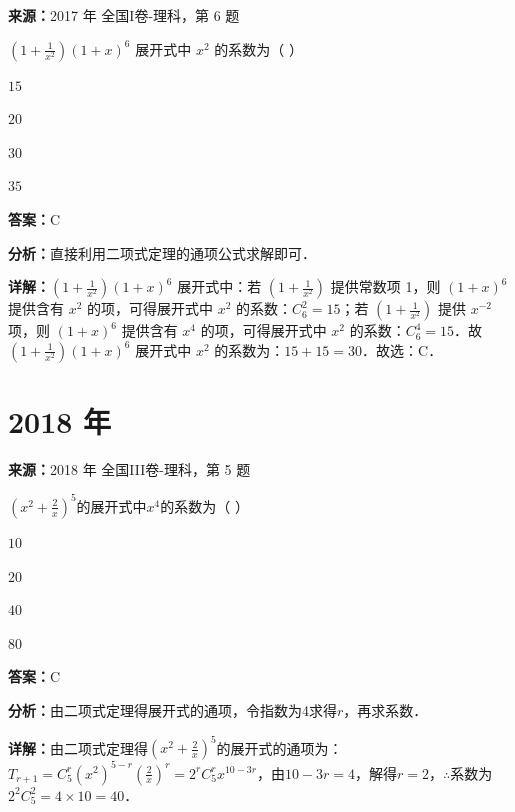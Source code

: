 \begin{question}[points=5]
\textbf{来源：}2017 年 全国I卷-理科，第 6 题\par
$(1+\frac{1}{x^2})(1+x)^6$ 展开式中 $x^2$ 的系数为（ ）
\begin{choices}
  \item $15$
  \item $20$
  \item $30$
  \item $35$
\end{choices}
\begin{solution}
\textbf{答案：}C

\textbf{分析：}直接利用二项式定理的通项公式求解即可．

\textbf{详解：}$(1+\frac{1}{x^2})(1+x)^6$ 展开式中：若 $(1+\frac{1}{x^2})$ 提供常数项 1，则 $(1+x)^6$ 提供含有 $x^2$ 的项，可得展开式中 $x^2$ 的系数：$C_6^2=15$；若 $(1+\frac{1}{x^2})$ 提供 $x^{-2}$ 项，则 $(1+x)^6$ 提供含有 $x^4$ 的项，可得展开式中 $x^2$ 的系数：$C_6^4=15$．故 $(1+\frac{1}{x^2})(1+x)^6$ 展开式中 $x^2$ 的系数为：$15+15=30$．故选：C．
\end{solution}
\end{question}

\section*{2018 年}

\begin{question}[points=5]
\textbf{来源：}2018 年 全国III卷-理科，第 5 题\par
$(x^2+\frac{2}{x})^5$的展开式中$x^4$的系数为（ ）
\begin{choices}
  \item $10$
  \item $20$
  \item $40$
  \item $80$
\end{choices}
\begin{solution}
\textbf{答案：}C

\textbf{分析：}由二项式定理得展开式的通项，令指数为4求得$r$，再求系数．

\textbf{详解：}由二项式定理得$(x^2+\frac{2}{x})^5$的展开式的通项为：$T_{r+1}=C_5^r (x^2)^{5-r}(\frac{2}{x})^r=2^r C_5^r x^{10-3r}$，由$10-3r=4$，解得$r=2$，$\therefore$系数为$2^2 C_5^2=4\times10=40$．
\end{solution}
\end{question}

